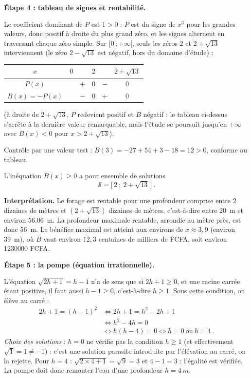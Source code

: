 \documentclass[11pt]{article}
\begin{document}
\begin{exoresolu}
\textbf{Étape 4 : tableau de signes et rentabilité.}

Le coefficient dominant de $P$ est $1>0$ : $P$ est du signe de $x^{3}$ pour les grandes valeurs, donc positif à droite du plus grand zéro, et les signes alternent en traversant chaque zéro simple. Sur $[0\,;+\infty[$, seuls les zéros $2$ et $2+\sqrt{13}$ interviennent (le zéro $2-\sqrt{13}$ est négatif, hors du domaine d'étude) :

\begin{center}
\begin{tabular}{|c|ccccc|}\hline
$x$ & $0$ & & $2$ & & $2+\sqrt{13}$ \\ \hline
$P(x)$ & & $+$ & $0$ & $-$ & $0$ \\ \hline
$B(x)=-P(x)$ & & $-$ & $0$ & $+$ & $0$ \\ \hline
\end{tabular}
\end{center}

(à droite de $2+\sqrt{13}$, $P$ redevient positif et $B$ négatif : le tableau ci-dessus s'arrête à la dernière valeur remarquable, mais l'étude se poursuit jusqu'en $+\infty$ avec $B(x)<0$ pour $x>2+\sqrt{13}$).

Contrôle par une valeur test : $B(3)=-27+54+3-18=12>0$, conforme au tableau.

L'inéquation $B(x)\geq 0$ a pour ensemble de solutions
\[ \mathcal{S}=\bigl[\,2\ ;\ 2+\sqrt{13}\,\bigr]\ .\]

\textbf{Interprétation.} Le forage est rentable pour une profondeur comprise entre $2$ dizaines de mètres et $(2+\sqrt{13})$ dizaines de mètres, c'est-à-dire entre \SI{20}{m} et environ \SI{56,06}{m}. La profondeur maximale rentable, arrondie au mètre près, est donc \SI{56}{m}. Le bénéfice maximal est atteint aux environs de $x\approx 3{,}9$ (environ \SI{39}{m}), où $B$ vaut environ $12{,}3$ centaines de milliers de FCFA, soit environ \num{1230000} FCFA.

\textbf{Étape 5 : la pompe (équation irrationnelle).}

L'équation $\sqrt{2h+1}=h-1$ n'a de sens que si $2h+1\geq 0$, et une racine carrée étant positive, il faut aussi $h-1\geq 0$, c'est-à-dire $h\geq 1$. Sous cette condition, on élève au carré :
\begin{align*}
2h+1=(h-1)^{2}&\iff 2h+1=h^{2}-2h+1\\
&\iff h^{2}-4h=0\\
&\iff h(h-4)=0\iff h=0\ \text{ou}\ h=4\ .
\end{align*}
\emph{Choix des solutions} : $h=0$ ne vérifie pas la condition $h\geq 1$ (et effectivement $\sqrt{1}=1\neq -1$) : c'est une solution parasite introduite par l'élévation au carré, on la rejette. Pour $h=4$ : $\sqrt{2\times 4+1}=\sqrt{9}=3$ et $4-1=3$ : l'égalité est vérifiée. La pompe doit donc remonter l'eau d'une profondeur $h=\SI{4}{m}$.


\end{exoresolu}
\end{document}

